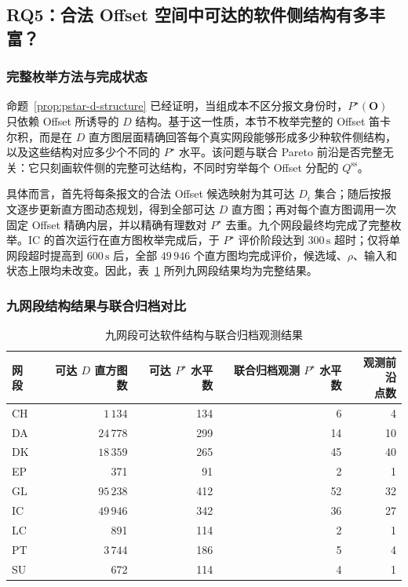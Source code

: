\documentclass[UTF8,a4paper,twoside,zihao=-4]{ctexart}
\numberwithin{equation}{section}
\numberwithin{figure}{section}
\numberwithin{table}{section}
\theoremstyle{definition}
\numberwithin{algocf}{section}
\begin{document}
\subsection{RQ5：合法 Offset 空间中可达的软件侧结构有多丰富？}
\label{subsec:exp-rq5}

\subsubsection{完整枚举方法与完成状态}
\label{subsubsec:exp-rq5-enumeration}

命题~\ref{prop:pstar-d-structure} 已经证明，当组成本不区分报文身份时，$P^\star(\boldsymbol O)$ 只依赖 Offset 所诱导的 $D$ 结构。基于这一性质，本节不枚举完整的 Offset 笛卡尔积，而是在 $D$ 直方图层面精确回答每个真实网段能够形成多少种软件侧结构，以及这些结构对应多少个不同的 $P^\star$ 水平。该问题与联合 Pareto 前沿是否完整无关：它只刻画软件侧的完整可达结构，不同时穷举每个 Offset 分配的 $Q^{\mathrm{ss}}$。

具体而言，首先将每条报文的合法 Offset 候选映射为其可达 $D_i$ 集合；随后按报文逐步更新直方图动态规划，得到全部可达 $D$ 直方图；再对每个直方图调用一次固定 Offset 精确内层，并以精确有理数对 $P^\star$ 去重。九个网段最终均完成了完整枚举。IC 的首次运行在直方图枚举完成后，于 $P^\star$ 评价阶段达到 $300\,\mathrm{s}$ 超时；仅将单网段超时提高到 $600\,\mathrm{s}$ 后，全部 $49\,946$ 个直方图均完成评价，候选域、$\rho$、输入和状态上限均未改变。因此，表~\ref{tab:exp-d-structure} 所列九网段结果均为完整结果。

\subsubsection{九网段结构结果与联合归档对比}
\label{subsubsec:exp-rq5-results}

\begin{table}[htbp]
\centering
\caption{九网段可达软件结构与联合归档观测结果}
\label{tab:exp-d-structure}
\scriptsize
\setlength{\tabcolsep}{4.2pt}
\begin{tabular}{@{}lrrrr@{}}
\toprule
网段 & \shortstack{可达 $D$\\直方图数} & \shortstack{可达 $P^\star$\\水平数} & \shortstack{联合归档观测\\$P^\star$ 水平数} & \shortstack{观测前沿\\点数} \\
\midrule
CH & $1\,134$ & 134 & 6 & 4 \\
DA & $24\,778$ & 299 & 14 & 10 \\
DK & $18\,359$ & 265 & 45 & 40 \\
EP & 371 & 91 & 2 & 1 \\
GL & $95\,238$ & 412 & 52 & 32 \\
IC & $49\,946$ & 342 & 36 & 27 \\
LC & 891 & 114 & 2 & 1 \\
PT & $3\,744$ & 186 & 5 & 4 \\
SU & 672 & 114 & 4 & 1 \\
\bottomrule
\end{tabular}
\end{table}
\end{document}
